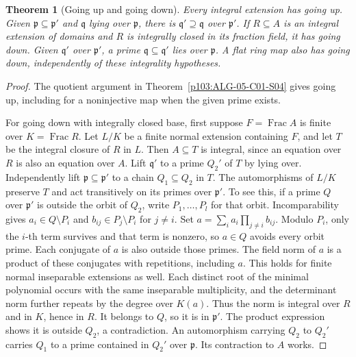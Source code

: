 \documentclass[11pt,oneside,openany]{book}
\newtheorem{theorem}{Theorem}[chapter]
\theoremstyle{definition}
\theoremstyle{remark}
\begin{document}
\begin{theorem}[Going up and going down]\label{p103:ALG-05-C01-R04}
Every integral extension has going up. Given \(\mathfrak p\subseteq\mathfrak p'\) and \(\mathfrak q\) lying over \(\mathfrak p\), there is \(\mathfrak q'\supseteq\mathfrak q\) over \(\mathfrak p'\). If \(R\subseteq A\) is an integral extension of domains and \(R\) is integrally closed in its fraction field, it has going down. Given \(\mathfrak q'\) over \(\mathfrak p'\), a prime \(\mathfrak q\subseteq\mathfrak q'\) lies over \(\mathfrak p\). A flat ring map also has going down, independently of these integrality hypotheses.
\end{theorem}
\begin{proof}
The quotient argument in Theorem~\ref{p103:ALG-05-C01-S04} gives going up, including for a noninjective map when the given prime exists.

For going down with integrally closed base, first suppose \(F=\operatorname{Frac}A\) is finite over \(K=\operatorname{Frac}R\). Let \(L/K\) be a finite normal extension containing \(F\), and let \(T\) be the integral closure of \(R\) in \(L\). Then \(A\subseteq T\) is integral, since an equation over \(R\) is also an equation over \(A\). Lift \(\mathfrak q'\) to a prime \(Q_2'\) of \(T\) by lying over. Independently lift \(\mathfrak p\subseteq\mathfrak p'\) to a chain \(Q_1\subseteq Q_2\) in \(T\). The automorphisms of \(L/K\) preserve \(T\) and act transitively on its primes over \(\mathfrak p'\). To see this, if a prime \(Q\) over \(\mathfrak p'\) is outside the orbit of \(Q_2\), write \(P_1,\ldots,P_l\) for that orbit. Incomparability gives \(a_i\in Q\setminus P_i\) and \(b_{ij}\in P_j\setminus P_i\) for \(j\ne i\). Set \(a=\sum_i a_i\prod_{j\ne i}b_{ij}\). Modulo \(P_i\), only the \(i\)-th term survives and that term is nonzero, so \(a\in Q\) avoids every orbit prime. Each conjugate of \(a\) is also outside those primes. The field norm of \(a\) is a product of these conjugates with repetitions, including \(a\). This holds for finite normal inseparable extensions as well. Each distinct root of the minimal polynomial occurs with the same inseparable multiplicity, and the determinant norm further repeats by the degree over \(K(a)\). Thus the norm is integral over \(R\) and in \(K\), hence in \(R\). It belongs to \(Q\), so it is in \(\mathfrak p'\). The product expression shows it is outside \(Q_2\), a contradiction. An automorphism carrying \(Q_2\) to \(Q_2'\) carries \(Q_1\) to a prime contained in \(Q_2'\) over \(\mathfrak p\). Its contraction to \(A\) works.


\end{proof}
\end{document}
